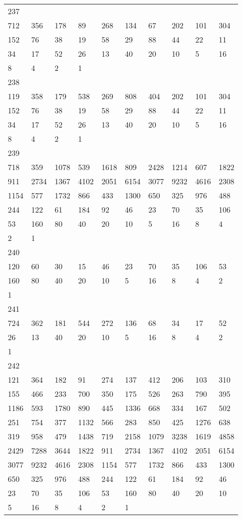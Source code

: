 \begin{longtable}{*{10}{l}}
237&&&&&&&&&\\
712& 356& 178& 89& 268& 134& 67& 202& 101& 304\\
152& 76& 38& 19& 58& 29& 88& 44& 22& 11\\
34& 17& 52& 26& 13& 40& 20& 10& 5& 16\\
8& 4& 2& 1& \\

238&&&&&&&&&\\
119& 358& 179& 538& 269& 808& 404& 202& 101& 304\\
152& 76& 38& 19& 58& 29& 88& 44& 22& 11\\
34& 17& 52& 26& 13& 40& 20& 10& 5& 16\\
8& 4& 2& 1& \\

239&&&&&&&&&\\
718& 359& 1078& 539& 1618& 809& 2428& 1214& 607& 1822\\
911& 2734& 1367& 4102& 2051& 6154& 3077& 9232& 4616& 2308\\
1154& 577& 1732& 866& 433& 1300& 650& 325& 976& 488\\
244& 122& 61& 184& 92& 46& 23& 70& 35& 106\\
53& 160& 80& 40& 20& 10& 5& 16& 8& 4\\
2& 1& \\

240&&&&&&&&&\\
120& 60& 30& 15& 46& 23& 70& 35& 106& 53\\
160& 80& 40& 20& 10& 5& 16& 8& 4& 2\\
1& \\

241&&&&&&&&&\\
724& 362& 181& 544& 272& 136& 68& 34& 17& 52\\
26& 13& 40& 20& 10& 5& 16& 8& 4& 2\\
1& \\

242&&&&&&&&&\\
121& 364& 182& 91& 274& 137& 412& 206& 103& 310\\
155& 466& 233& 700& 350& 175& 526& 263& 790& 395\\
1186& 593& 1780& 890& 445& 1336& 668& 334& 167& 502\\
251& 754& 377& 1132& 566& 283& 850& 425& 1276& 638\\
319& 958& 479& 1438& 719& 2158& 1079& 3238& 1619& 4858\\
2429& 7288& 3644& 1822& 911& 2734& 1367& 4102& 2051& 6154\\
3077& 9232& 4616& 2308& 1154& 577& 1732& 866& 433& 1300\\
650& 325& 976& 488& 244& 122& 61& 184& 92& 46\\
23& 70& 35& 106& 53& 160& 80& 40& 20& 10\\
5& 16& 8& 4& 2& 1& \\


\end{longtable}
